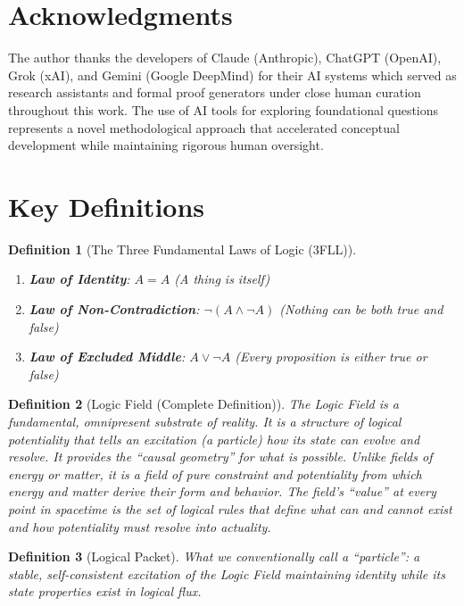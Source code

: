 \documentclass[12pt,a4paper]{article}
\newtheorem{definition}{Definition}
\begin{document}
\section*{Acknowledgments}

The author thanks the developers of Claude (Anthropic), ChatGPT (OpenAI), Grok (xAI), and Gemini (Google DeepMind) for their AI systems which served as research assistants and formal proof generators under close human curation throughout this work. The use of AI tools for exploring foundational questions represents a novel methodological approach that accelerated conceptual development while maintaining rigorous human oversight.




\appendix

\section{Key Definitions}

\begin{definition}[The Three Fundamental Laws of Logic (3FLL)]
~\\
\begin{enumerate}
\item \textbf{Law of Identity}: $A = A$ (A thing is itself)
\item \textbf{Law of Non-Contradiction}: $\neg(A \land \neg A)$ (Nothing can be both true and false)
\item \textbf{Law of Excluded Middle}: $A \lor \neg A$ (Every proposition is either true or false)
\end{enumerate}
\end{definition}

\begin{definition}[Logic Field (Complete Definition)]
The Logic Field is a fundamental, omnipresent substrate of reality. It is a structure of logical potentiality that tells an excitation (a particle) how its state can evolve and resolve. It provides the ``causal geometry'' for what is possible. Unlike fields of energy or matter, it is a field of pure constraint and potentiality from which energy and matter derive their form and behavior. The field's ``value'' at every point in spacetime is the set of logical rules that define what can and cannot exist and how potentiality must resolve into actuality.
\end{definition}

\begin{definition}[Logical Packet]
What we conventionally call a ``particle'': a stable, self-consistent excitation of the Logic Field maintaining identity while its state properties exist in logical flux.
\end{definition}
\end{document}
